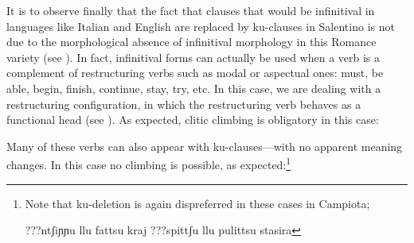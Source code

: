 \documentclass[output=paper]{langscibook}
\begin{document}
\ea \label{ac19}
    \z
\z
    
It is to observe finally that the fact that clauses that would be infinitival in languages like Italian and English are replaced by ku-clauses in Salentino is not due to the morphological absence of infinitival morphology in this Romance variety (see \cite{calabrese1993a}). In fact, infinitival forms can actually be used when a verb is a complement of restructuring verbs such as modal or aspectual ones: must, be able, begin, finish, continue, stay, try, etc. In this case, we are dealing with a restructuring configuration, in which the restructuring verb behaves as a functional head (see \cite{rizzi1976a, rizzi1978a, cinque2001a, cinque2006a, wurmbrand2001a,wurmbrand2004a,wurmbrand2015,wurmbrand2017verb}).  As expected, clitic climbing is obligatory in this case:

\ea \label{ac20}
    \z
\z

Many of these verbs can also appear with ku-clauses—with no apparent meaning changes. In this case no climbing is possible, as expected:\footnote{Note that ku-deletion is again dispreferred in these cases in Campiota;

\ea \label{fn10ex}
    \ea \label{fn10exa}???ntʃiɲɲu llu fattsu kraj  
    \ex \label{fn10exb}???spittʃu llu pulittsu stasira
    \z
\z

} 
\end{document}
